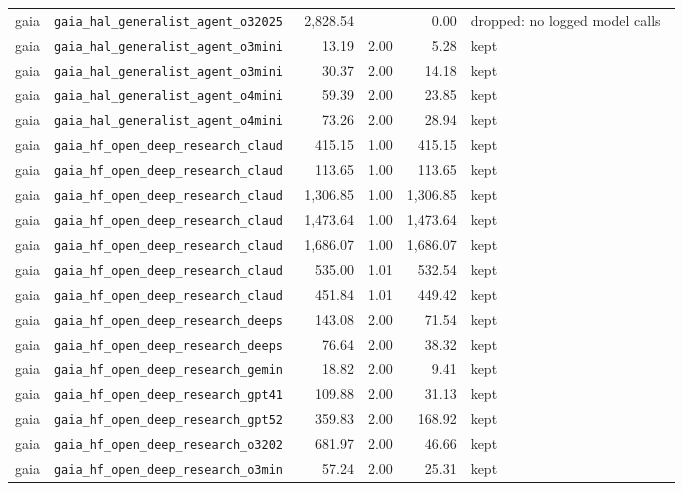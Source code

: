 {\begin{longtable}{llrrrl}
gaia & \texttt{\scriptsize gaia\_hal\_generalist\_agent\_o32025~} & 2,828.54 &  & 0.00 & dropped: no logged model calls~ \\
gaia & \texttt{\scriptsize gaia\_hal\_generalist\_agent\_o3mini~} & 13.19 & 2.00 & 5.28 & kept \\
gaia & \texttt{\scriptsize gaia\_hal\_generalist\_agent\_o3mini~} & 30.37 & 2.00 & 14.18 & kept \\
gaia & \texttt{\scriptsize gaia\_hal\_generalist\_agent\_o4mini~} & 59.39 & 2.00 & 23.85 & kept \\
gaia & \texttt{\scriptsize gaia\_hal\_generalist\_agent\_o4mini~} & 73.26 & 2.00 & 28.94 & kept \\
gaia & \texttt{\scriptsize gaia\_hf\_open\_deep\_research\_claud~} & 415.15 & 1.00 & 415.15 & kept \\
gaia & \texttt{\scriptsize gaia\_hf\_open\_deep\_research\_claud~} & 113.65 & 1.00 & 113.65 & kept \\
gaia & \texttt{\scriptsize gaia\_hf\_open\_deep\_research\_claud~} & 1,306.85 & 1.00 & 1,306.85 & kept \\
gaia & \texttt{\scriptsize gaia\_hf\_open\_deep\_research\_claud~} & 1,473.64 & 1.00 & 1,473.64 & kept \\
gaia & \texttt{\scriptsize gaia\_hf\_open\_deep\_research\_claud~} & 1,686.07 & 1.00 & 1,686.07 & kept \\
gaia & \texttt{\scriptsize gaia\_hf\_open\_deep\_research\_claud~} & 535.00 & 1.01 & 532.54 & kept \\
gaia & \texttt{\scriptsize gaia\_hf\_open\_deep\_research\_claud~} & 451.84 & 1.01 & 449.42 & kept \\
gaia & \texttt{\scriptsize gaia\_hf\_open\_deep\_research\_deeps~} & 143.08 & 2.00 & 71.54 & kept \\
gaia & \texttt{\scriptsize gaia\_hf\_open\_deep\_research\_deeps~} & 76.64 & 2.00 & 38.32 & kept \\
gaia & \texttt{\scriptsize gaia\_hf\_open\_deep\_research\_gemin~} & 18.82 & 2.00 & 9.41 & kept \\
gaia & \texttt{\scriptsize gaia\_hf\_open\_deep\_research\_gpt41~} & 109.88 & 2.00 & 31.13 & kept \\
gaia & \texttt{\scriptsize gaia\_hf\_open\_deep\_research\_gpt52~} & 359.83 & 2.00 & 168.92 & kept \\
gaia & \texttt{\scriptsize gaia\_hf\_open\_deep\_research\_o3202~} & 681.97 & 2.00 & 46.66 & kept \\
gaia & \texttt{\scriptsize gaia\_hf\_open\_deep\_research\_o3min~} & 57.24 & 2.00 & 25.31 & kept \\

\end{longtable}}

